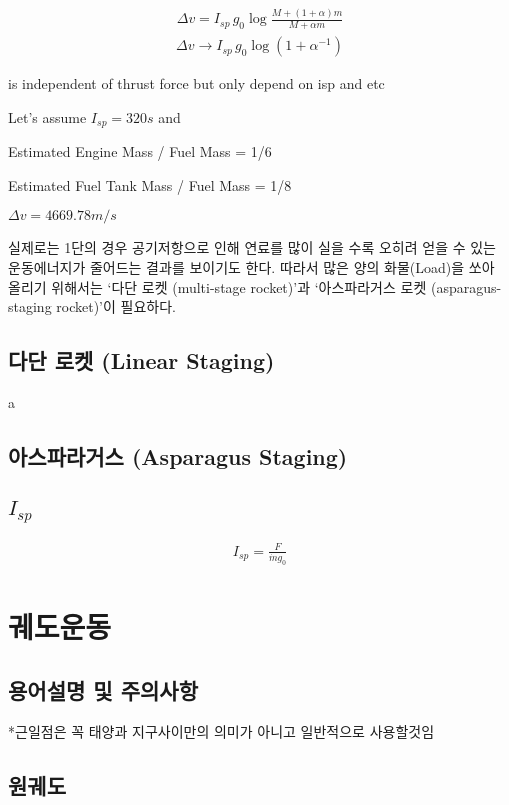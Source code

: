 \documentclass[10pt]{amsbook}
\begin{document}
\begin{align}
    \Delta v = I_{sp}\, g_0\log\frac{M+(1+\alpha) m}{M+\alpha m}
\end{align}
\begin{align}
    \Delta v \rightarrow I_{sp}\, g_0\log(1+\alpha^{-1})
\end{align}

is independent of thrust force but only depend on isp and etc

Let's assume $I_{sp} =320 s$ and 

Estimated Engine Mass / Fuel Mass = 1/6

Estimated Fuel Tank Mass / Fuel Mass = 1/8

$\Delta v = 4669.78 m/s$

실제로는 1단의 경우 공기저항으로 인해 연료를 많이 실을 수록 오히려 얻을 수 있는 운동에너지가 줄어드는 결과를 보이기도 한다. 따라서 많은 양의 화물(Load)을 쏘아 올리기 위해서는 `다단 로켓 (multi-stage rocket)'과 `아스파라거스 로켓 (asparagus-staging rocket)'이 필요하다.


\section{다단 로켓 (Linear Staging)}
a


\section{아스파라거스 (Asparagus Staging)}

\section{$I_{sp}$}
\begin{align}
I_{sp} = \frac{F}{\dot{m}g_0}
\end{align}


\chapter{궤도운동}
\section{용어설명 및 주의사항}
*근일점은 꼭 태양과 지구사이만의 의미가 아니고 일반적으로 사용할것임
\section{원궤도}
\end{document}
